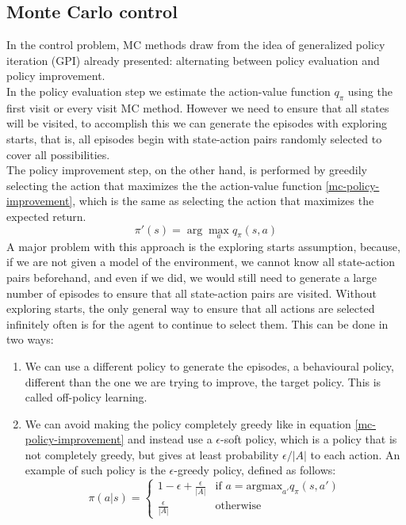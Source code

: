 \subsection{Monte Carlo control}
In the control problem, MC methods draw from the idea of generalized policy iteration (GPI) already presented: alternating between policy evaluation and policy improvement.\\
In the policy evaluation step we estimate the action-value function $q_{\pi}$ using the first visit or every visit MC method. However we need to ensure that all states will be visited, to accomplish this we can generate the episodes with exploring starts, that is, all episodes begin with state-action pairs randomly selected to cover all possibilities.\\
The policy improvement step, on the other hand, is performed by greedily selecting the action that maximizes the the action-value function \ref{mc-policy-improvement}, which is the same as selecting the action that maximizes the expected return.
\begin{equation}
    \pi'(s) = \arg \max_a q_{\pi}(s, a)
    \label{mc-policy-improvement}
\end{equation}
A major problem with this approach is the exploring starts assumption, because, if we are not given a model of the environment, we cannot know all state-action pairs beforehand, and even if we did, we would still need to generate a large number of episodes to ensure that all state-action pairs are visited. Without exploring starts, the only general way to ensure that all actions are selected infinitely often is for the agent to continue to select them. This can be done in two ways:
\begin{enumerate}
    \item We can use a different policy to generate the episodes, a behavioural policy, different than the one we are trying to improve, the target policy. This is called off-policy learning.
    \item We can avoid making the policy completely greedy like in equation \ref{mc-policy-improvement} and instead use a $\epsilon$-soft policy, which is a policy that is not completely greedy, but gives at least probability $\epsilon / |A|$ to each action. An example of such policy is the $\epsilon$-greedy policy, defined as follows:
    \begin{equation}
        \pi(a|s) = \begin{cases}
            1 - \epsilon + \frac{\epsilon}{|A|} & \text{if } a = \mathrm{argmax}_{a'} q_{\pi}(s, a') \\
            \frac{\epsilon}{|A|} & \text{otherwise}
        \end{cases}
        \label{epsilon-greedy-policy}
    \end{equation}
\end{enumerate}


